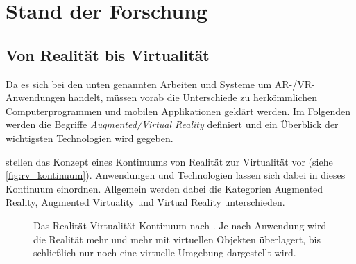 \chapter{Stand der Forschung}
\label{chap:related_work}

\section{Von Realität bis Virtualität}
Da es sich bei den unten genannten Arbeiten und Systeme um AR-/VR-Anwendungen handelt, müssen vorab die Unterschiede zu herkömmlichen Computerprogrammen und mobilen Applikationen geklärt werden.
Im Folgenden werden die Begriffe \emph{Augmented/Virtual Reality} definiert und ein Überblick der wichtigsten Technologien wird gegeben.

\textcite{Milgram1994} stellen das Konzept eines Kontinuums von Realität zur Virtualität vor (siehe \autoref{fig:rv_kontinuum}).
Anwendungen und Technologien lassen sich dabei in dieses Kontinuum einordnen.
Allgemein werden dabei die Kategorien Augmented Reality, Augmented Virtuality und Virtual Reality unterschieden.

\begin{figure}
    \centering
    \caption{Das Realität-Virtualität-Kontinuum nach \textcite{Milgram1994}. Je nach Anwendung wird die Realität mehr und mehr mit virtuellen Objekten überlagert, bis schließlich nur noch eine virtuelle Umgebung dargestellt wird.}
    \label{fig:rv_kontinuum}
\end{figure}

